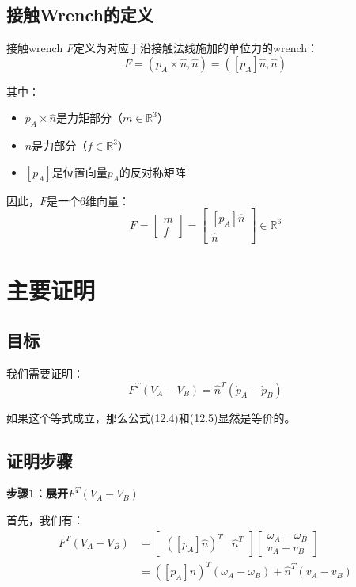 \documentclass[12pt,a4paper]{article}
\begin{document}
\subsection{接触Wrench的定义}

接触wrench $F$定义为对应于沿接触法线施加的单位力的wrench：
\begin{equation}
F = (p_A \times \hat{n}, \hat{n}) = ([p_A]\hat{n}, \hat{n})
\label{eq:wrench_definition}
\end{equation}

其中：
\begin{itemize}
\item $p_A \times \hat{n}$是力矩部分（$m \in \mathbb{R}^3$）
\item $\hat{n}$是力部分（$f \in \mathbb{R}^3$）
\item $[p_A]$是位置向量$p_A$的反对称矩阵
\end{itemize}

因此，$F$是一个6维向量：
\begin{equation}
F = \begin{bmatrix} m \\ f \end{bmatrix} = \begin{bmatrix} [p_A]\hat{n} \\ \hat{n} \end{bmatrix} \in \mathbb{R}^6
\end{equation}

\section{主要证明}

\subsection{目标}

我们需要证明：
\begin{equation}
F^T (V_A - V_B) = \hat{n}^T (\dot{p}_A - \dot{p}_B)
\label{eq:equivalence}
\end{equation}

如果这个等式成立，那么公式(12.4)和(12.5)显然是等价的。

\subsection{证明步骤}

\textbf{步骤1：展开$F^T (V_A - V_B)$}

首先，我们有：
\begin{align}
F^T (V_A - V_B) &= \begin{bmatrix} ([p_A]\hat{n})^T & \hat{n}^T \end{bmatrix} \begin{bmatrix} \omega_A - \omega_B \\ v_A - v_B \end{bmatrix} \\
&= ([p_A]\hat{n})^T (\omega_A - \omega_B) + \hat{n}^T (v_A - v_B)
\label{eq:step1}
\end{align}
\end{document}
